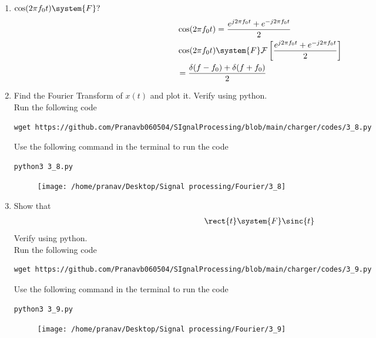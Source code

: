 \documentclass[journal,12pt,twocolumn]{IEEEtran}
\renewcommand\thesection{\arabic{section}}
\begin{document}
\begin{enumerate}[label=\thesection.\arabic*
,ref=\thesection.\theenumi]
\begin{align}
         &\delta(t-t_0)\system{F}e^{-j2\pi f t_0}\\
         &G(t)\system{F}g(-f)\\
         &\therefore e^{-j2 \pi f_0 t}\system{F}\delta(f-f_0)
     \end{align}
 \item $\cos(2\pi f_0t)\system{F}?$\\
\solution \begin{align}
    &\cos(2\pi f_0t)=\frac{e^{j2\pi f_0t}+e^{-j2\pi f_0t}}{2}\\
    &\cos(2\pi f_0 t)\system{F}\mathcal{F}\left[\frac{e^{j2\pi f_0t}+e^{-j2\pi f_0t}}{2}\right]\\
    &=\frac{\delta(f-f_0)+\delta(f+f_0)}{2}
\end{align}
 \item Find the Fourier Transform of $x(t)$ and plot it.  Verify using python.\\
     \solution
	Run the following code 
\begin{lstlisting}
wget https://github.com/Pranavb060504/SIgnalProcessing/blob/main/charger/codes/3_8.py
\end{lstlisting}
Use the following command in the terminal to run the code
\begin{lstlisting}
python3 3_8.py
\end{lstlisting}
	    \begin{figure}[!ht]
			\centering
			\texttt{[image: /home/pranav/Desktop/Signal processing/Fourier/3\_8]}
			\caption{}
			\label{fig:3_8}
\end{figure}

 \item Show that 
 \begin{align}
	 \rect{t} \system{F} \sinc{t}
 \end{align}
 Verify using python.\\

 \solution 	Run the following code 
\begin{lstlisting}
wget https://github.com/Pranavb060504/SIgnalProcessing/blob/main/charger/codes/3_9.py
\end{lstlisting}
Use the following command in the terminal to run the code
\begin{lstlisting}
python3 3_9.py
\end{lstlisting}
	    \begin{figure}[!ht]
			\centering
			\texttt{[image: /home/pranav/Desktop/Signal processing/Fourier/3\_9]}
			\caption{}
			\label{fig:3_9}
\end{figure}


\end{enumerate}
\end{document}
